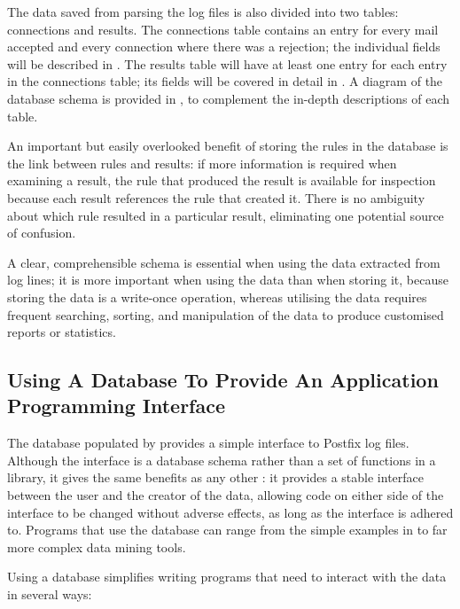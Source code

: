 The data saved from parsing the log files is also divided into two tables:
connections and results.  The connections table contains an entry for every
mail accepted and every connection where there was a rejection; the
individual fields will be described in .  The
results table will have at least one entry for each entry in the
connections table; its fields will be covered in detail in
.  A diagram of the database schema is provided
in , to complement the
in-depth descriptions of each table.

An important but easily overlooked benefit of storing the rules in the
database is the link between rules and results: if more information is
required when examining a result, the rule that produced the result is
available for inspection because each result references the rule that
created it.  There is no ambiguity about which rule resulted in a
particular result, eliminating one potential source of confusion.

A clear, comprehensible schema is essential when using the data extracted
from log lines; it is more important when using the data than when storing
it, because storing the data is a write-once operation, whereas utilising
the data requires frequent searching, sorting, and manipulation of the data
to produce customised reports or statistics.

\subsection{Using A Database To Provide An Application Programming Interface}

\label{database as API}

The database populated by \parsername{} provides a simple interface to
Postfix log files.  Although the interface is a database schema rather than
a set of functions in a library, it gives the same benefits as any other
: it provides a stable interface between the user and the
creator of the data, allowing code on either side of the interface to be
changed without adverse effects, as long as the interface is adhered to.
Programs that use the database can range from the simple examples in
 to far more complex data mining tools.

Using a database simplifies writing programs that need to interact with the
data in several ways:

